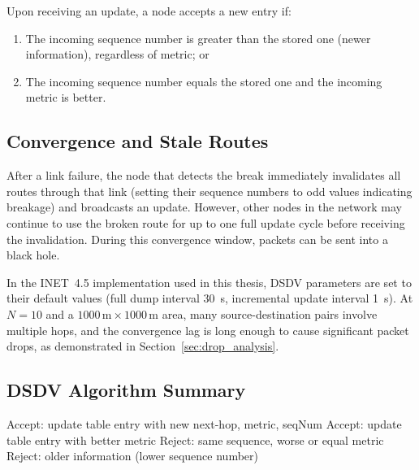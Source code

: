 Upon receiving an update, a node accepts a new entry if:
\begin{enumerate}
  \item The incoming sequence number is greater than the stored one (newer information), regardless of metric; or
  \item The incoming sequence number equals the stored one and the incoming metric is better.
\end{enumerate}

\subsection{Convergence and Stale Routes}

After a link failure, the node that detects the break immediately invalidates all routes
through that link (setting their sequence numbers to odd values indicating breakage) and
broadcasts an update. However, other nodes in the network may continue to use the broken
route for up to one full update cycle before receiving the invalidation. During this
convergence window, packets can be sent into a black hole.

In the INET~4.5 implementation used in this thesis, DSDV parameters are set to their
default values (full dump interval 30~s, incremental update interval 1~s). At $N = 10$
and a $1000\,\text{m} \times 1000\,\text{m}$ area, many source-destination pairs involve
multiple hops, and the convergence lag is long enough to cause significant packet drops,
as demonstrated in Section~\ref{sec:drop_analysis}.

\subsection{DSDV Algorithm Summary}

\begin{algorithm}[ht]
\caption{DSDV Route Update Processing}
\begin{algorithmic}[1]
    \State Accept: update table entry with new next-hop, metric, seqNum
      \State Accept: update table entry with better metric
    \Else
      \State Reject: same sequence, worse or equal metric
    \EndIf
  \Else
    \State Reject: older information (lower sequence number)
  \EndIf
\EndFor
\end{algorithmic}
\end{algorithm}

